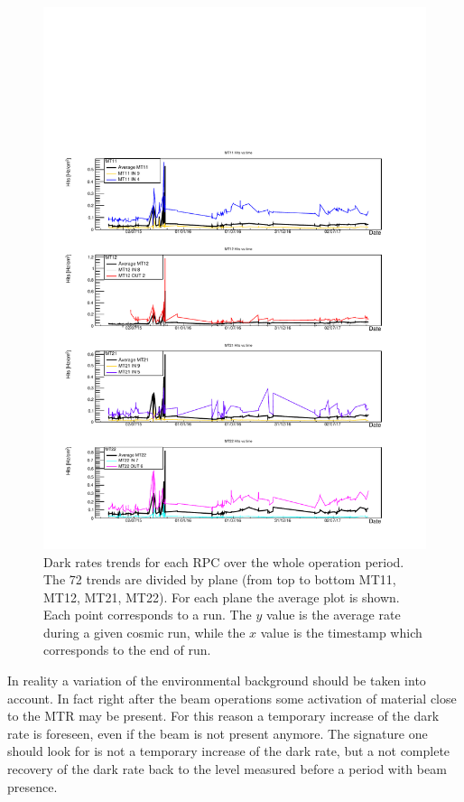 \begin{figure}[!t]
\begin{center}
\includegraphics[width=0.95\linewidth]{Chapters/Performance/Figs/DarkRate.pdf}
\caption{Dark rates trends for each RPC over the whole operation period. The 72 trends are divided by plane (from top to bottom MT11, MT12, MT21, MT22). For each plane the average plot is shown. Each point corresponds to a run. The $y$ value is the average rate during a given cosmic run, while the $x$ value is the timestamp which corresponds to the end of run.}
\label{fig:DarkRate4Planes}
\end{center}
\end{figure}

In reality a variation of the environmental background should be taken into account.
In fact right after the beam operations some activation of material close to the MTR may be present.
For this reason a temporary increase of the dark rate is foreseen, even if the beam is not present anymore.
The signature one should look for is not a temporary increase of the dark rate, but a not complete recovery of the dark rate back to the level measured before a period with beam presence.

